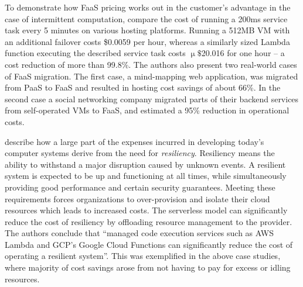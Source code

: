 To demonstrate how FaaS pricing works out in the customer's advantage in the case of intermittent computation, \textcite{adzic2017serverless} compare the cost of running a 200ms service task every 5 minutes on various hosting platforms. Running a 512MB VM with an additional failover costs \$0.0059 per hour, whereas a similarly sized Lambda function executing the described service task costs $\upmu\$$20.016 for one hour -- a cost reduction of more than 99.8\%. The authors also present two real-world cases of FaaS migration. The first case, a mind-mapping web application, was migrated from PaaS to FaaS and resulted in hosting cost savings of about 66\%. In the second case a social networking company migrated parts of their backend services from self-operated VMs to FaaS, and estimated a 95\% reduction in operational costs.

\textcite{wagner16resilient} describe how a large part of the expenses incurred in developing today's computer systems derive from the need for \textit{resiliency}. Resiliency means the ability to withstand a major disruption caused by unknown events. A resilient system is expected to be up and functioning at all times, while simultaneously providing good performance and certain security guarantees. Meeting these requirements forces organizations to over-provision and isolate their cloud resources which leads to increased costs. The serverless model can significantly reduce the cost of resiliency by offloading resource management to the provider. The authors conclude that ``managed code execution services such as AWS Lambda and GCP’s Google Cloud Functions can significantly reduce the cost of operating a resilient system''. This was exemplified in the above case studies, where majority of cost savings arose from not having to pay for excess or idling resources.

